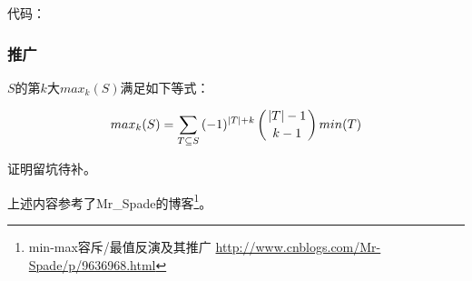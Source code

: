 代码：


\subsubsection{推广}
$S$的第$k$大$max_k(S)$满足如下等式：

\begin{displaymath}
	max_k(S)=\sum_{T\subseteq S}{(-1)^{|T|+k}\left(|T|-1 \atop k-1\right)min(T)}
\end{displaymath}

证明留坑待补。

上述内容参考了Mr\_Spade的博客\footnote{
	min-max容斥/最值反演及其推广
	\url{http://www.cnblogs.com/Mr-Spade/p/9636968.html}
}。
